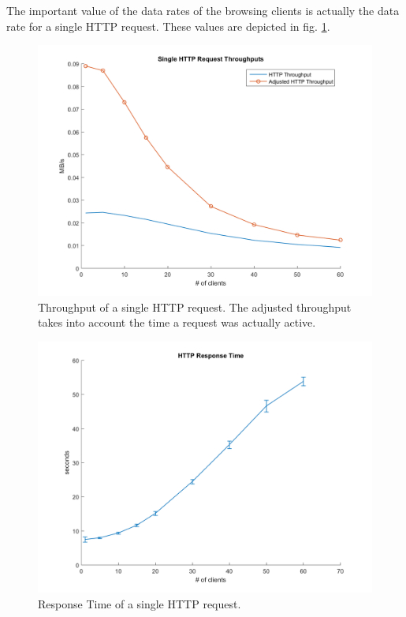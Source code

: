 \documentclass[
10pt, %
a4paper, %
oneside, %
headinclude,footinclude, %
BCOR5mm, %
]{scrartcl}
\begin{document}
The important value of the data rates of the browsing clients is actually the data rate for a single HTTP request. These values are depicted in fig. \ref{fig:cctv_http_request_throughput}.
\begin{figure}[!ht]
  \centering
  \includegraphics[width=\textwidth]{Figures/cctv/Single_HTTP_Request_Throughputs.png}
  \caption{Throughput of a single HTTP request. The adjusted throughput takes into account the time a request was actually active.} \label{fig:cctv_http_request_throughput}
\end{figure}
\begin{figure}[!ht]
  \centering
  \includegraphics[width=\textwidth]{Figures/cctv/HTTP_Response_Time.png}
  \caption{Response Time of a single HTTP request.} \label{fig:cctv_http_request_time}
\end{figure}
\end{document}
